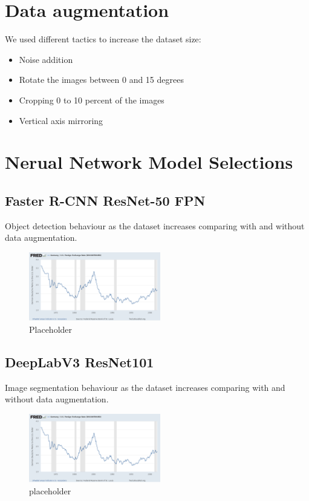 \documentclass[10pt,conference,compsocconf]{IEEEtran}
\begin{document}
\section{Data augmentation}
\label{sec:PreCond}
We used different tactics to increase the dataset size:
\begin{itemize}
    \item Noise addition
    \item Rotate the images between 0 and 15 degrees
    \item Cropping 0 to 10 percent of the images
    \item Vertical axis mirroring
\end{itemize}

\section{Nerual Network Model Selections}


\subsection{Faster R-CNN ResNet-50 FPN}
Object detection behaviour as the dataset increases comparing with and without data augmentation.
\begin{figure}[h!]
  \centering
  \includegraphics[width=\columnwidth, height=30mm]{download.png}
  \vspace{-5mm}
  \caption{Placeholder}
  \label{fig:first}
\end{figure}

\subsection{DeepLabV3 ResNet101}
Image segmentation behaviour as the dataset increases comparing with and without data augmentation.
\begin{figure}[h!]
  \centering
  \includegraphics[width=\columnwidth, height=30mm]{download.png}
  \vspace{-5mm}
  \caption{placeholder}
  \label{fig:second}
\end{figure}
\end{document}
